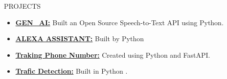 \documentclass{resume}
\begin{document}
\begin{rSection}{PROJECTS}
    \begin{itemize}
        \item \textbf{\href{https://github.com/trishaamandal/Gen-AI}{GEN\_AI:}} {Built an Open Source Speech-to-Text API using Python.}
        \vspace{-0.6em}
        \item \textbf{\href{https://github.com/trishaamandal/VoiceAssistent}{ALEXA ASSISTANT:}} {Built by Python}
        \vspace{-0.6em}
        \item \textbf{\href{https://github.com/trishaamandal/tracking_number}{Traking Phone Number:}} {Created using Python and FastAPI.}
        \vspace{-0.6em}
        \item \textbf{\href{https://github.com/trishaamandal/Trafic_Detection}{Trafic Detection:}} {Built in Python .}
        \vspace{-0.6em}
    \end{itemize}
\end{rSection}
\vspace{-0.4em}
\end{document}
